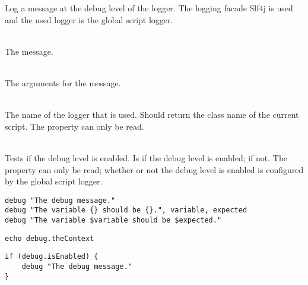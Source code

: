 %


Log a message at the debug level of the logger.
The logging facade Slf4j\cite{slf4j13} is used and the used logger is
the global script logger.

\begin{asparadesc}
%
\item[\code{message}] \hfill \\
The message.
%
\item[\code{arguments...}] \hfill \\
The arguments for the message.
%
\item[\code{theContext}] \hfill \\
The name of the logger that is used. Should return the class name of the current
script. The property can only be read.
%
\item[\code{isEnabled}] \hfill \\
Tests if the debug level is enabled. Is  if the debug level is enabled;
 if not. The property can only be read; whether or not the debug
level is enabled is configured by the global script logger.
%
\end{asparadesc}

\begin{lstlisting}[style=Groovybash, label={lst:example_debug1}, title={%
Outputs a debug logging message with arguments.}]
debug "The debug message."
debug "The variable {} should be {}.", variable, expected
debug "The variable $variable should be $expected."
\end{lstlisting}

\begin{lstlisting}[style=Groovybash, label={lst:example_debug2}, title={%
Prints the name of the current logger.}]
echo debug.theContext
\end{lstlisting}

\begin{lstlisting}[style=Groovybash, label={lst:example_debug3}, title={%
Tests if the debug level is enabled.}]
if (debug.isEnabled) {
    debug "The debug message."
}
\end{lstlisting}

